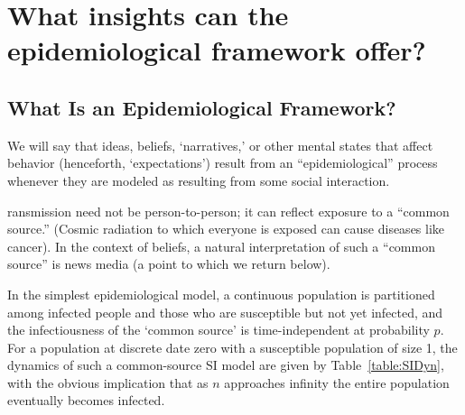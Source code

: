 \section{What insights can the epidemiological framework
  offer?}\label{what-insights-can-the-epidemiological-framework-offer}

\subsection{What Is an Epidemiological Framework?}
\label{subsec:epi_framework}

We will say that ideas, beliefs, `narratives,' or other mental states that affect behavior (henceforth, `expectations') result from an ``epidemiological'' process whenever they are modeled as resulting from some social interaction.

ransmission need not be person-to-person; it can reflect exposure to a ``common source.''  (Cosmic radiation to which everyone is exposed can cause diseases like cancer).  %
In the context of beliefs, a natural interpretation of such a ``common source'' is news media (a point to which we return below). 

In the simplest epidemiological model, a continuous population is partitioned among infected people {\Infected} and those who are susceptible {\Susceptible} but not yet infected, and the infectiousness of the `common source' is time-independent at probability $p$.  For a population at discrete date zero with a susceptible population of size 1, the dynamics of such a common-source SI model are given by Table~\ref{table:SIDyn}, with the obvious implication that as $n$ approaches infinity the entire population eventually becomes infected.

